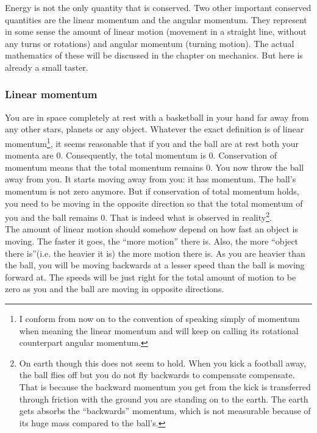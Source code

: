 \noindent Energy is not the only quantity that is conserved. Two other important conserved quantities are the linear momentum and the angular momentum. They represent in some sense the amount of linear motion (movement in a straight line, without any turns or rotations) and angular momentum (turning motion). The actual mathematics of these will be discussed in the chapter on mechanics. But here is already a small taster.

\subsubsection{Linear momentum}

\noindent You are in space completely at rest with a basketball in your hand far away from any other stars, planets or any object. Whatever the exact definition is of linear momentum\footnote{I conform from now on to the convention of speaking simply of momentum when meaning the linear momentum and will keep on calling its rotational counterpart angular momentum.}, it seems reasonable that if you and the ball are at rest both your momenta are 0. Consequently, the total momentum is 0. Conservation of momentum means that the total momentum remains 0. You now throw the ball away from you. It starts moving away from you: it has momentum. The ball's momentum is not zero anymore. But if conservation of total momentum holds, you need to be moving in the opposite direction so that the total momentum of you and the ball remains 0. That is indeed what is observed in reality\footnote{On earth though this does not seem to hold. When you kick a football away, the ball flies off but you do not fly backwards to compensate compensate. That is because the backward momentum you get from the kick is transferred through friction with the ground you are standing on to the earth. The earth gets absorbs the "`backwards"' momentum, which is not measurable because of its huge mass compared to the ball's.}.\\

\noindent The amount of linear motion should somehow depend on how fast an object is moving. The faster it goes, the "`more motion"' there is. Also, the more "`object there is"'(i.e. the heavier it is) the more motion there is. As you are heavier than the ball, you will be moving backwards at a lesser speed than the ball is moving forward at. The speeds will be just right for the total amount of motion to be zero as you and the ball are moving in opposite directions.\\

